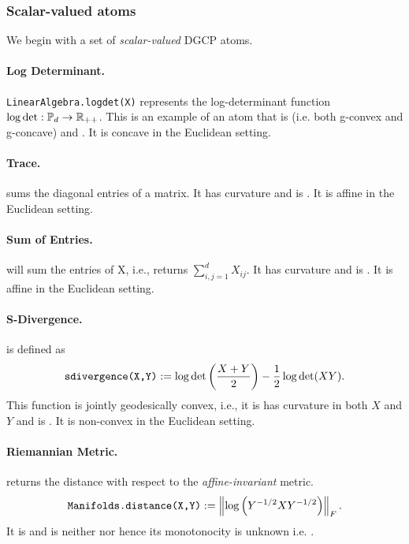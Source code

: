 \documentclass[twoside,11pt]{article}
\begin{document}
\subsubsection{Scalar-valued atoms}
We begin with a set of \textit{scalar-valued} DGCP atoms.
\paragraph{Log Determinant.}
 \texttt{LinearAlgebra.logdet(X)} represents the log-determinant function $\log \det: \mathbb{P}_d \to \mathbb{R}_{++}$. This is an example of an atom that is  (i.e. both g-convex and g-concave) and . It is concave in the Euclidean setting. 
 
\paragraph{Trace.}  sums the diagonal entries of a matrix. It has  curvature and is . It is affine in the Euclidean setting.

\paragraph{Sum of Entries.} 
 will sum the entries of X, i.e., returns $\sum_{i,j=1}^d X_{ij}$. It has  curvature and is . It is affine in the Euclidean setting.  

\paragraph{S-Divergence.}
 is defined as 
\begin{equation}\label{eq:sdiv}
    \texttt{sdivergence(X,Y)} := \log \det \left( \frac{X+Y}{2} \right) - \frac{1}{2}\log \det (XY).
\end{equation}
This function is jointly geodesically convex, i.e., it is has  curvature in both $X$ and $Y$ and is . It is non-convex in the Euclidean setting.

\paragraph{Riemannian Metric.}
 returns the distance with respect to the \textit{affine-invariant} metric. 
\[
\texttt{Manifolds.distance(X,Y)} := \left\|\log \left(Y^{-1/2}X Y^{-1/2}\right)\right\|_F.
\] 
It is  and is neither  nor  hence its monotonocity is unknown i.e. .
\end{document}

